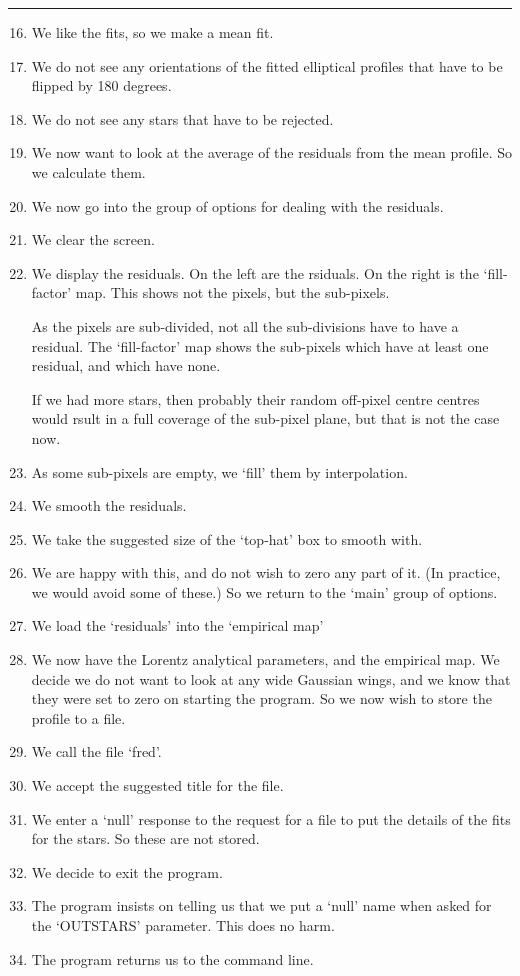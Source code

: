 \begin{small}
{{\vspace*{3mm}
\hspace*{13mm}\rule{5in}{0.25mm}
\vspace*{1mm}

\begin{enumerate}
\setcounter{enumi}{15}
\item We like the fits, so we make a mean fit.
\item We do not see any orientations of the fitted elliptical profiles
      that have to be flipped by 180 degrees.
\item We do not see any stars that have to be rejected.
\item We now want to look at the average of the residuals from the
      mean profile. So we calculate them.
\item We now go into the group of options for dealing with the
      residuals.
\item We clear the screen.
\item We display the residuals. On the left are the rsiduals. On the
      right is the `fill-factor' map. This shows not the pixels, but the
      sub-pixels.

      As the pixels are sub-divided, not all the sub-divisions have to
      have a residual. The `fill-factor' map shows the sub-pixels which
      have at least one residual, and which have none.

      If we had more stars, then probably their random off-pixel centre
      centres would rsult in a full coverage of the sub-pixel plane, but
      that is not the case now.
\item As some sub-pixels are empty, we `fill' them by interpolation.
\item We smooth the residuals.
\item We take the suggested size of the `top-hat' box to smooth with.
\item We are happy with this, and do not wish to zero any part of it.
      (In practice, we would avoid some of these.) So we return to
      the `main' group of options.
\item We load the `residuals' into the `empirical map'
\item We now have the Lorentz analytical parameters, and the empirical
      map. We decide we do not want to look at any wide Gaussian wings,
      and we know that they were set to zero on starting the program.
      So we now wish to store the profile to a file.
\item We call the file `fred'.
\item We accept the suggested title for the file.
\item We enter a `null' response to the request for a file to put
      the details of the fits for the stars. So these are not stored.
\item We decide to exit the program.
\item The program insists on telling us that we put a `null' name
      when asked for the `OUTSTARS' parameter. This does no harm.
\item The program returns us to the command line.
\end{enumerate}

}}
\end{small}
